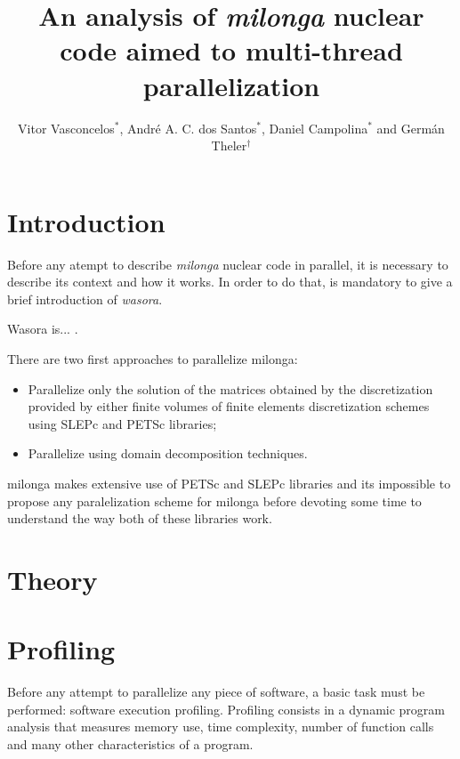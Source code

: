 \documentclass{anstrans}
\title{An analysis of \textit{milonga} nuclear code aimed to multi-thread parallelization}
\author{Vitor Vasconcelos$^{*}$, Andr\'e A. C. dos Santos$^{*}$, Daniel Campolina$^{*}$ and Germ\'an Theler$^{\dagger}$}
\institute{
$^{*}$Centro de Desenvolvimento da Tecnologia Nuclear, CEP 31270-901,
Belo Horizonte - MG, Brazil
\and
$^{\dagger}$Seamplex, Rafaela, Argentina
}
\begin{document}
\vspace*{-42pt}
\begin{strip}
\vspace*{14pt}
\end{strip}


\section{Introduction}

Before any atempt to describe \textit{milonga} nuclear code in parallel, it is
necessary to describe its context and how it works. In order to do that, is mandatory
to give a brief introduction of \textit{wasora}.

Wasora is... \cite{wasora}.

There are two first approaches to parallelize milonga:
\begin{itemize}
\item Parallelize only the solution of the matrices obtained by the discretization
  provided by either finite volumes of finite elements discretization schemes using
  SLEPc and PETSc libraries;
\item Parallelize using domain decomposition techniques.
\end{itemize}

milonga makes extensive use of PETSc \cite{petsc} and SLEPc \cite{Hernandez2005} libraries and
its impossible to propose any paralelization scheme for milonga before devoting some
time to understand the way both of these libraries work.

\section{Theory}

\section{Profiling}
Before any attempt to parallelize any piece of software, a basic task must be performed:
software execution profiling. Profiling consists in a dynamic program analysis
that measures memory use, time complexity, number of function calls and many other characteristics of
a program.
\end{document}

